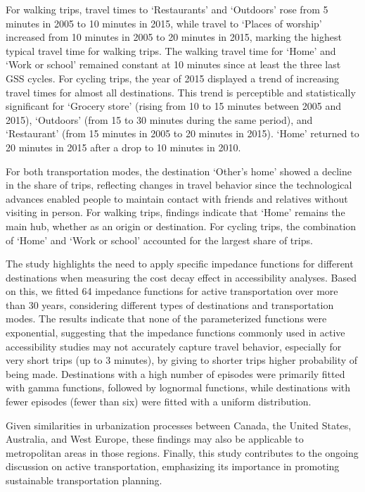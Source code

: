 \documentclass[preprint, 3p,
authoryear]{elsarticle} %
\begin{document}
For walking trips, travel times to `Restaurants' and `Outdoors' rose
from 5 minutes in 2005 to 10 minutes in 2015, while travel to `Places of
worship' increased from 10 minutes in 2005 to 20 minutes in 2015,
marking the highest typical travel time for walking trips. The walking
travel time for `Home' and `Work or school' remained constant at 10
minutes since at least the three last GSS cycles. For cycling trips, the
year of 2015 displayed a trend of increasing travel times for almost all
destinations. This trend is perceptible and statistically significant
for `Grocery store' (rising from 10 to 15 minutes between 2005 and
2015), `Outdoors' (from 15 to 30 minutes during the same period), and
`Restaurant' (from 15 minutes in 2005 to 20 minutes in 2015). `Home'
returned to 20 minutes in 2015 after a drop to 10 minutes in 2010.

For both transportation modes, the destination `Other's home' showed a
decline in the share of trips, reflecting changes in travel behavior
since the technological advances enabled people to maintain contact with
friends and relatives without visiting in person. For walking trips,
findings indicate that `Home' remains the main hub, whether as an origin
or destination. For cycling trips, the combination of `Home' and `Work
or school' accounted for the largest share of trips.

The study highlights the need to apply specific impedance functions for
different destinations when measuring the cost decay effect in
accessibility analyses. Based on this, we fitted 64 impedance functions
for active transportation over more than 30 years, considering different
types of destinations and transportation modes. The results indicate
that none of the parameterized functions were exponential, suggesting
that the impedance functions commonly used in active accessibility
studies may not accurately capture travel behavior, especially for very
short trips (up to 3 minutes), by giving to shorter trips higher
probability of being made. Destinations with a high number of episodes
were primarily fitted with gamma functions, followed by lognormal
functions, while destinations with fewer episodes (fewer than six) were
fitted with a uniform distribution.

Given similarities in urbanization processes between Canada, the United
States, Australia, and West Europe, these findings may also be
applicable to metropolitan areas in those regions. Finally, this study
contributes to the ongoing discussion on active transportation,
emphasizing its importance in promoting sustainable transportation
planning.
\end{document}
